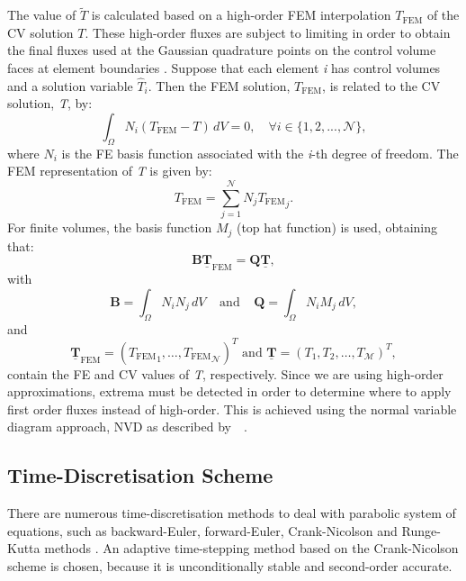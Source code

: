 \documentclass[preprint,authoryear,12pt]{elsarticle}
\newcommand{\jrp}[1]{\todo[color=blue!30, size=\small]{JRP: #1}}
\begin{document}
\medskip
The value of $\widetilde{T}$ is calculated based on a high-order FEM interpolation $T_{\mbox{FEM}}$ of the CV solution $T$. These high-order fluxes are subject to limiting in order to obtain the final fluxes used at the Gaussian quadrature points on the control volume faces at element boundaries \citep{voller_2009,gomes_book_2012}.  Suppose that each element {\it i} has control volumes and a solution variable \jrp{is this used anywhere?} $\hat T_{i}$. Then the FEM solution, $T_{\mbox{FEM}}$, is related to the CV solution, {\it T}, by:
\begin{equation}
  \int_{\Omega} N_{i} \left({T_{\mbox{FEM}}} - T\right) \,d V = 0, \quad \forall i\in \{1,2,...,{\mathcal N}\},
\end{equation}
where $N_{i}$ is the FE basis function associated with the {\it i}-th degree of freedom. The FEM representation of \textit{T} is given by:
\begin{equation}
  T_{\mbox{FEM}} = \sum\limits_{j=1}^{\mathcal{N}} N_{j} {T_{\mbox{FEM}}}_{j}.
\end{equation}
For finite volumes, the basis function $M_{j}$ (top hat function) is used, obtaining that:
\begin{equation}
  \mathbf{B} \underline{\mathbf{T}}_{\mbox{FEM}} = \mathbf{Q} \underline{\mathbf{T}},
\end{equation} 
with
\begin{displaymath}
  \mathbf{B} = \int_{\Omega} N_{i}N_{j} \,dV \;\;\;\;\text{and}\;\;\;\; \mathbf{Q} = \int_{\Omega} N_{i} M_{j} \,  dV,
\end{displaymath} 
and
\begin{displaymath}
\underline{\mathbf{T}}_{\mbox{FEM}} = \left({T_{\mbox{FEM}}}_{1}, \ldots, {T_{\mbox{FEM}}}_{\mathcal{N}} \right)^{T} \text{ and } \underline{\mathbf{T}} =\left(T_{1}, T_{2}, \ldots, T_\mathcal{M} \right)^{T},
\end{displaymath}
contain the FE and CV values of {\it T}, respectively. Since we are using high-order approximations, extrema must be detected in order to determine where to apply first order fluxes instead of high-order. This is achieved using the normal variable diagram approach, NVD as described by~\citet{darwish_1993}~\citep[see also][]{jasak_1999,darwish_2003}.

\subsection{Time-Discretisation Scheme} \label{time_discretisation}
There are numerous time-discretisation methods to deal with parabolic system of equations, such as backward-Euler, forward-Euler, Crank-Nicolson and Runge-Kutta methods \citep{weng_2012}. An adaptive time-stepping method based on the Crank-Nicolson scheme is chosen, because it is unconditionally stable and second-order accurate.
\end{document}
